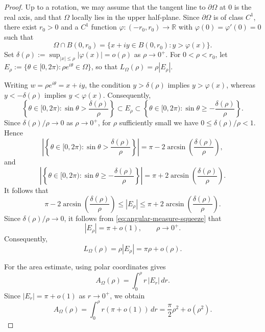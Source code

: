 \documentclass[12pt,twoside]{amsart}
\numberwithin{equation}{section}
\newtheorem{lemma}[theorem]{Lemma}
\numberwithin{definition}{section} %
\begin{document}
\begin{proof}
Up to a rotation, we may assume that the tangent line to $\partial\Omega$ at $0$ is the real axis, and that $\Omega$ locally lies in the upper half-plane. Since $\partial\Omega$ is of class $C^1$, there exist $r_0 > 0$ and a $C^1$ function $\varphi \colon (-r_0, r_0) \to \mathbb{R}$ with $\varphi(0) = \varphi'(0) = 0$ such that
\[
\Omega \cap B(0, r_0) = \{x + iy \in B(0, r_0) : y > \varphi(x)\}.
\]
Set $\delta(\rho) := \sup_{|x| \le \rho} |\varphi(x)| = o(\rho)$ as $\rho \to 0^+$. For $0 < \rho < r_0$, let $E_\rho := \{\theta \in [0, 2\pi) : \rho e^{i\theta} \in \Omega\}$, so that $L_\Omega(\rho) = \rho |E_\rho|$. 

Writing $w = \rho e^{i\theta} = x + iy$, the condition $y > \delta(\rho)$ implies $y > \varphi(x)$, whereas $y < -\delta(\rho)$ implies $y < \varphi(x)$. Consequently,
\[
\left\{\theta \in [0, 2\pi) : \sin\theta > \frac{\delta(\rho)}{\rho}\right\}
\subset E_\rho \subset
\left\{\theta \in [0, 2\pi) : \sin\theta \ge -\frac{\delta(\rho)}{\rho}\right\}.
\]
Since $\delta(\rho)/\rho \to 0$ as $\rho \to 0^+$, for $\rho$ sufficiently small we have $0 \le \delta(\rho)/\rho < 1$. Hence
$$
\left|\left\{ \theta \in [0, 2\pi) : \sin \theta > \frac{\delta(\rho)}{\rho} \right\}\right| = \pi - 2 \arcsin \left( \frac{\delta(\rho)}{\rho} \right),
$$
and
$$
\left|\left\{ \theta \in [0, 2\pi) : \sin \theta \ge -\frac{\delta(\rho)}{\rho} \right\}\right| = \pi + 2 \arcsin \left( \frac{\delta(\rho)}{\rho} \right).
$$
It follows that
\begin{equation}\label{eq:angular-measure-squeeze}
\pi-2\arcsin\!\left(\frac{\delta(\rho)}{\rho}\right)
\leq |E_\rho| \leq
\pi+2\arcsin\!\left(\frac{\delta(\rho)}{\rho}\right).
\end{equation}
Since $\delta(\rho)/\rho\to0$, it follows from
\eqref{eq:angular-measure-squeeze} that
\[
|E_\rho|=\pi+o(1),
\qquad \rho\to0^+.
\]
Consequently,
\[
L_\Omega(\rho)=\rho|E_\rho|=\pi\rho+o(\rho).
\]
		
For the area estimate, using polar coordinates gives
\[
A_{\Omega}(\rho)=\int_{0}^{\rho} r\,|E_{r}|\,dr.
\]
Since $|E_{r}|=\pi+o(1)$ as $r\to0^{+}$, we obtain
\[
A_{\Omega}(\rho)
=\int_{0}^{\rho} r(\pi+o(1))\,dr
=\frac{\pi}{2}\rho^{2}+o(\rho^{2}).
\]
	\end{proof}
\end{document}
